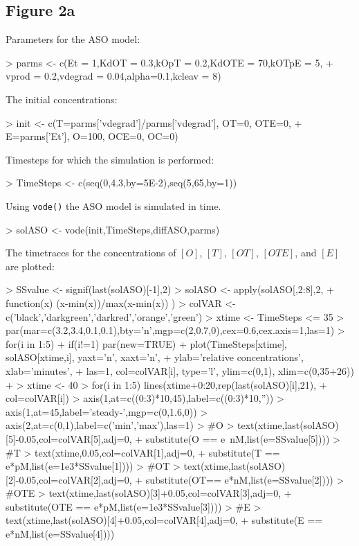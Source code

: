\documentclass{article}
\begin{document}
\subsection*{Figure 2a}
Parameters for the ASO model:
\begin{Schunk}
\begin{Sinput}
> parms <- c(Et = 1,KdOT = 0.3,kOpT = 0.2,KdOTE = 70,kOTpE = 5,  
+            vprod = 0.2,vdegrad = 0.04,alpha=0.1,kcleav = 8)
\end{Sinput}
\end{Schunk}
The initial concentrations:
\begin{Schunk}
\begin{Sinput}
> init <- c(T=parms['vdegrad']/parms['vdegrad'], OT=0, OTE=0, 
+           E=parms['Et'], O=100, OCE=0, OC=0)
\end{Sinput}
\end{Schunk}
Timesteps for which the simulation is performed:
\begin{Schunk}
\begin{Sinput}
> TimeSteps <- c(seq(0,4.3,by=5E-2),seq(5,65,by=1))
\end{Sinput}
\end{Schunk}
Using \texttt{vode()} the ASO model is simulated in time.
\begin{Schunk}
\begin{Sinput}
> solASO <- vode(init,TimeSteps,diffASO,parms)
\end{Sinput}
\end{Schunk}
The timetraces for the concentrations of $[O]$, $[T]$, $[OT]$, $[OTE]$, and $[E]$ are plotted:
\begin{Schunk}
\begin{Sinput}
> SSvalue <- signif(last(solASO)[-1],2)
> solASO <- apply(solASO[,2:8],2,
+                 function(x) (x-min(x))/max(x-min(x)) )
> colVAR <- c('black','darkgreen','darkred','orange','green')
> xtime <- TimeSteps <= 35
> par(mar=c(3.2,3.4,0.1,0.1),bty='n',mgp=c(2,0.7,0),cex=0.6,cex.axis=1,las=1)
> for(i in 1:5){ 
+   if(i!=1) par(new=TRUE)
+   plot(TimeSteps[xtime], solASO[xtime,i], yaxt='n', xaxt='n',
+        ylab='relative concentrations', xlab='minutes',
+        las=1, col=colVAR[i], type='l', ylim=c(0,1), xlim=c(0,35+26))
+ }
> xtime <- 40
> for(i in 1:5) lines(xtime+0:20,rep(last(solASO)[i],21),
+                     col=colVAR[i])
> axis(1,at=c((0:3)*10,45),label=c((0:3)*10,''))
> axis(1,at=45,label='steady-\nstate',mgp=c(0,1.6,0))
> axis(2,at=c(0,1),label=c('min','max'),las=1)
> #O
> text(xtime,last(solASO)[5]-0.05,col=colVAR[5],adj=0,
+      substitute(O == e~nM,list(e=SSvalue[5])))
> #T
> text(xtime,0.05,col=colVAR[1],adj=0,
+      substitute(T == e*pM,list(e=1e3*SSvalue[1])))
> #OT
> text(xtime,last(solASO)[2]-0.05,col=colVAR[2],adj=0,
+      substitute(OT== e*nM,list(e=SSvalue[2])))
> #OTE
> text(xtime,last(solASO)[3]+0.05,col=colVAR[3],adj=0,
+      substitute(OTE == e*pM,list(e=1e3*SSvalue[3])))
> #E
> text(xtime,last(solASO)[4]+0.05,col=colVAR[4],adj=0,
+      substitute(E == e*nM,list(e=SSvalue[4])))
\end{Sinput}
\end{Schunk}
\end{document}
